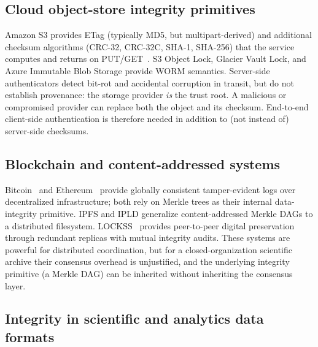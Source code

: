 \documentclass[11pt]{article}
\begin{document}
\subsection{Cloud object-store integrity primitives}

Amazon S3 provides ETag (typically MD5, but multipart-derived) and additional
checksum algorithms (CRC-32, CRC-32C, SHA-1, SHA-256) that the service computes
and returns on PUT/GET~\cite{s3checksums}. S3 Object Lock, Glacier Vault Lock,
and Azure Immutable Blob Storage provide WORM semantics. Server-side
authenticators detect bit-rot and accidental corruption in transit, but do
not establish provenance: the storage provider \emph{is} the trust root. A
malicious or compromised provider can replace both the object and its
checksum. End-to-end client-side authentication is therefore needed in
addition to (not instead of) server-side checksums.

\subsection{Blockchain and content-addressed systems}

Bitcoin~\cite{nakamoto2008bitcoin} and Ethereum~\cite{ethereumyellow} provide
globally consistent tamper-evident logs over decentralized infrastructure;
both rely on Merkle trees as their internal data-integrity primitive. IPFS
\cite{benet2014ipfs} and IPLD generalize content-addressed Merkle DAGs to a
distributed filesystem. LOCKSS~\cite{maniatis2005lockss,rosenthal2003lockss}
provides peer-to-peer digital preservation through redundant replicas with
mutual integrity audits. These systems are powerful for distributed
coordination, but for a closed-organization scientific archive their consensus
overhead is unjustified, and the underlying integrity primitive (a Merkle DAG)
can be inherited without inheriting the consensus layer.

\subsection{Integrity in scientific and analytics data formats}
\end{document}
